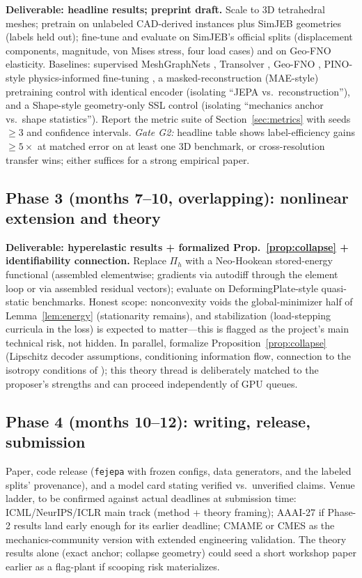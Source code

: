 \documentclass[11pt]{article}
\begin{document}
\textbf{Deliverable: headline results; preprint draft.}
Scale to 3D tetrahedral meshes; pretrain on unlabeled CAD-derived instances
plus SimJEB geometries (labels held out); fine-tune and evaluate on SimJEB's
official splits (displacement components, magnitude, von Mises stress, four
load cases) and on Geo-FNO elasticity. Baselines: supervised MeshGraphNets
\cite{pfaff2021}, Transolver \cite{wu2024transolver}, Geo-FNO
\cite{li2023geofno}, PINO-style physics-informed fine-tuning
\cite{li2024pino}, a masked-reconstruction (MAE-style) pretraining control
with identical encoder (isolating ``JEPA vs.\ reconstruction''), and a
Shape-style geometry-only SSL control (isolating ``mechanics anchor vs.\
shape statistics''). Report the metric suite of
Section~\ref{sec:metrics} with seeds $\ge 3$ and confidence intervals.
\emph{Gate G2:} headline table shows label-efficiency gains $\ge 5\times$ at
matched error on at least one 3D benchmark, or cross-resolution transfer
wins; either suffices for a strong empirical paper.

\subsection{Phase 3 (months 7--10, overlapping): nonlinear extension and theory}

\textbf{Deliverable: hyperelastic results + formalized Prop.~\ref{prop:collapse} + identifiability connection.}
Replace $\Pi_h$ with a Neo-Hookean stored-energy functional (assembled
elementwise; gradients via autodiff through the element loop or via assembled
residual vectors); evaluate on DeformingPlate-style quasi-static benchmarks.
Honest scope: nonconvexity voids the global-minimizer half of
Lemma~\ref{lem:energy} (stationarity remains), and stabilization
(load-stepping curricula in the loss) is expected to matter---this is
flagged as the project's main technical risk, not hidden. In parallel,
formalize Proposition~\ref{prop:collapse} (Lipschitz decoder assumptions,
conditioning information flow, connection to the isotropy conditions of
\cite{klindt2026}); this theory thread is deliberately matched to the
proposer's strengths and can proceed independently of GPU queues.

\subsection{Phase 4 (months 10--12): writing, release, submission}

Paper, code release (\texttt{fejepa} with frozen configs, data generators,
and the labeled splits' provenance), and a model card stating verified vs.\
unverified claims. Venue ladder, to be confirmed against actual deadlines at
submission time: ICML/NeurIPS/ICLR main track (method + theory framing);
AAAI-27 if Phase-2 results land early enough for its earlier deadline;
CMAME or CMES as the mechanics-community version with extended engineering
validation. The theory results alone (exact anchor; collapse geometry) could
seed a short workshop paper earlier as a flag-plant if scooping risk
materializes.
\end{document}
